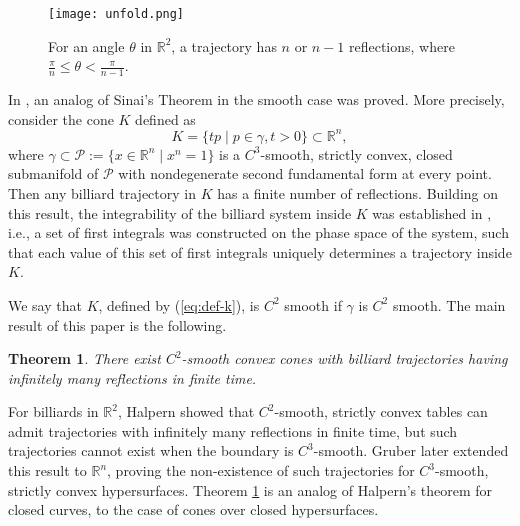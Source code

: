\documentclass[12pt]{article}
\newtheorem{theorem}{Theorem}
\begin{document}
  \begin{figure}[h]
    \begin{center}
    \texttt{[image: unfold.png]}
    \end{center}
    \caption{For an angle $\theta$ in $\mathbb{R}^2$, a trajectory has $n$ or $n-1$ reflections, where $\frac{\pi}{n} \leq \theta < \frac{\pi}{n-1}$.
      }
    \label{fig:angle-theta}
  \end{figure}
  
In \cite{MY}, an analog of Sinai's Theorem in the smooth case was proved. More precisely, consider the cone $K$ defined as  
\begin{equation}\label{eq:def-k}
  K = \{ tp \mid p \in \gamma, t > 0 \} \subset \mathbb{R}^n,
\end{equation}
where $\gamma \subset \mathcal{P}:= \{ x \in \mathbb{R}^n \mid x^n = 1 \}$ is a $C^3$-smooth, strictly convex, closed submanifold of $\mathcal{P}$ with nondegenerate second fundamental form at every point. 
Then any billiard trajectory in $K$ has a finite number of reflections. 
Building on this result, the integrability of the billiard system inside $K$ was established in \cite{MY}, i.e., a set of first integrals was constructed on the phase space of the system, such that each value of this set of first integrals uniquely determines a trajectory inside $K$.

We say that $K$, defined by (\ref{eq:def-k}), is $C^2$ smooth if $\gamma$ is $C^2$ smooth. The main result of this paper is the following.
\begin{theorem}\label{thm:c2}
  There exist $C^2$-smooth  convex cones with billiard trajectories having infinitely many reflections in finite time.
\end{theorem}

For billiards in ${\mathbb R}^2$, Halpern \cite{Hal} showed that $C^2$-smooth, strictly convex tables can admit trajectories with infinitely many reflections in finite time, but such trajectories cannot exist when the boundary is $C^3$-smooth. Gruber \cite{Gru2} later extended this result to ${\mathbb R}^n$, proving the non-existence of such trajectories for $C^3$-smooth, strictly convex hypersurfaces. Theorem \ref{thm:c2} is an analog of Halpern's theorem for closed curves, to the case of cones over  closed hypersurfaces.
\end{document}
